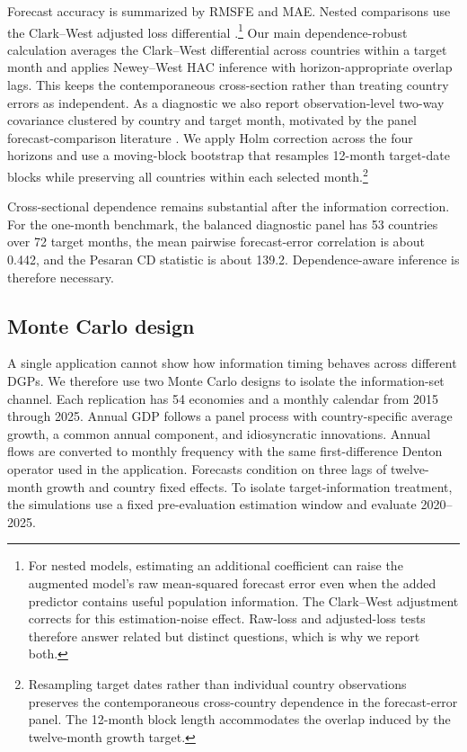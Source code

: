 \documentclass[preprint,12pt,authoryear]{elsarticle}
\begin{document}
Forecast accuracy is summarized by RMSFE and MAE. Nested comparisons use the
Clark--West adjusted loss differential \citep{clarkwest2007}.\footnote{For
nested models, estimating an additional coefficient can raise the augmented
model's raw mean-squared forecast error even when the added predictor contains
useful population information. The Clark--West adjustment corrects for this
estimation-noise effect. Raw-loss and adjusted-loss tests therefore answer
related but distinct questions, which is why we report both.} Our main
dependence-robust calculation averages the Clark--West differential across
countries within a target month and applies Newey--West HAC inference with
horizon-appropriate overlap lags. This keeps the contemporaneous cross-section
rather than treating country errors as independent. As a diagnostic we also
report observation-level two-way covariance clustered by country and target
month, motivated by the panel forecast-comparison literature
\citep{qu2024,akgun2024,coroneo2025}. We apply Holm correction across the four
horizons and use a moving-block bootstrap that resamples 12-month target-date
blocks while preserving all countries within each selected
month.\footnote{Resampling target dates rather than individual country
observations preserves the contemporaneous cross-country dependence in the
forecast-error panel. The 12-month block length accommodates the overlap
induced by the twelve-month growth target.}

Cross-sectional dependence remains substantial after the information
correction. For the one-month benchmark, the balanced diagnostic panel has 53
countries over 72 target months, the mean pairwise forecast-error correlation
is about 0.442, and the Pesaran CD statistic is about 139.2. Dependence-aware
inference is therefore necessary.

\subsection{Monte Carlo design}

A single application cannot show how information timing behaves across
different DGPs. We therefore use two Monte Carlo designs to isolate the
information-set channel. Each replication has 54 economies and a monthly
calendar from 2015 through 2025. Annual GDP follows a panel process with
country-specific average growth, a common annual component, and idiosyncratic
innovations. Annual flows are converted to monthly frequency with the same
first-difference Denton operator used in the application. Forecasts condition
on three lags of twelve-month growth and country fixed effects. To isolate
target-information treatment, the simulations use a fixed pre-evaluation
estimation window and evaluate 2020--2025.
\end{document}
